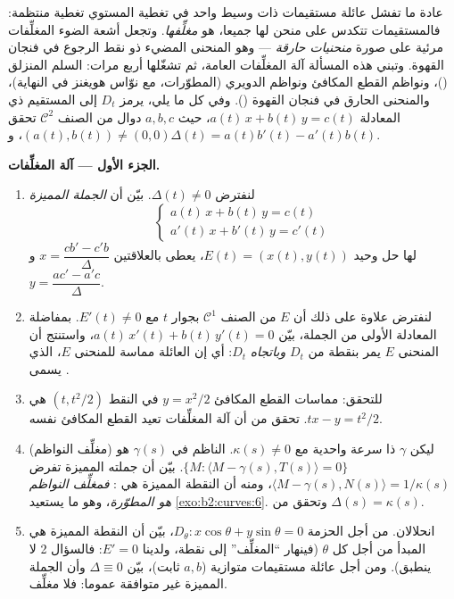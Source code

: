 \begin{problem}\label{pb:b2:curves:1}
عادة ما تفشل عائلة مستقيمات ذات وسيط واحد في تغطية المستوي تغطية
منتظمة: فالمستقيمات تتكدس على منحن  لها جميعا، هو
\emph{مغلِّفها}. وتجعل أشعة الضوء المغلِّفات مرئية على
صورة \emph{منحنيات حارقة} --- وهو المنحنى المضيء ذو نقط الرجوع في
فنجان القهوة. وتبني هذه المسألة آلة المغلِّفات العامة، ثم تشغّلها
أربع مرات: السلم المنزلق ()، ونواظم القطع المكافئ ونواظم
الدويري (المطوّرات، مع نوّاس هويغنز في النهاية)، والمنحنى الحارق في
فنجان القهوة (). وفي كل ما يلي، يرمز $D_t$ إلى المستقيم ذي
المعادلة $a(t)\,x + b(t)\,y = c(t)$، حيث $a, b, c$ دوال من الصنف $\mathcal C^2$ تحقق $(a(t), b(t)) \neq (0,0)$،
و$\Delta(t) = a(t)b'(t) - a'(t)b(t)$.

\medskip
\noindent\textbf{الجزء الأول --- آلة المغلِّفات.}
\begin{enumerate}
  \item لنفترض $\Delta(t) \neq 0$. بيّن أن \emph{الجملة المميزة}
        \[
        \begin{cases} a(t)\,x + b(t)\,y = c(t)\\
        a'(t)\,x + b'(t)\,y = c'(t)\end{cases}
        \]
        لها حل وحيد $E(t) = (x(t), y(t))$، يعطى بالعلاقتين $x = \dfrac{cb' - c'b}{\Delta}$ و$y = \dfrac{ac' -
        a'c}{\Delta}$.
  \item لنفترض علاوة على ذلك أن $E$ من الصنف $\mathcal C^1$ بجوار
        $t$ مع $E'(t) \neq 0$. بمفاضلة المعادلة الأولى من الجملة، بيّن
        $a(t)\,x'(t) +
        b(t)\,y'(t) = 0$، واستنتج أن المنحنى $E$ يمر بنقطة من $D_t$
        \emph{وباتجاه} $D_t$: أي إن العائلة مماسة للمنحنى $E$،
        الذي يسمى \emph{}.
  \item للتحقق: مماسات القطع المكافئ $y =
        x^2/2$ في النقط $(t, t^2/2)$ هي
        $tx - y =
        t^2/2$. تحقق من أن آلة المغلِّفات تعيد القطع المكافئ نفسه.
  \item (مغلِّف النواظم) ليكن $\gamma$ ذا سرعة واحدية مع $\kappa(s) \neq 0$.
        الناظم في $\gamma(s)$ هو $\{M : \langle M - \gamma(s), T(s)
        \rangle = 0\}$. بيّن أن جملته المميزة تفرض
        $\langle M - \gamma(s), N(s)\rangle =
        1/\kappa(s)$، ومنه أن النقطة المميزة هي :
        \emph{فمغلِّف النواظم هو المطوّرة}، وهو ما يستعيد \cref{exo:b2:curves:6}.
        وتحقق من $\Delta(s) =
        \kappa(s)$.
  \item انحلالان. من أجل الحزمة $D_\theta : x\cos
        \theta + y\sin\theta = 0$، بيّن أن النقطة المميزة هي
        المبدأ من أجل كل $\theta$ (فينهار ``المغلِّف'' إلى نقطة، ولدينا
        $E' = 0$: فالسؤال 2 لا ينطبق). ومن أجل عائلة مستقيمات متوازية
        ($a, b$ ثابت)، بيّن $\Delta \equiv 0$ وأن الجملة المميزة غير متوافقة
        عموما: فلا مغلِّف.
\end{enumerate}


\end{problem}
